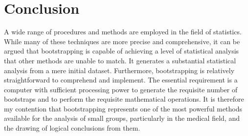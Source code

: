 
\chapter{Conclusion} \label{Conclusion}
A wide range of procedures and methods are employed in the field of statistics. While many of these techniques are more precise and comprehensive, it can be argued that bootstrapping is capable of achieving a level of statistical analysis that other methods are unable to match. It generates a substantial statistical analysis from a mere initial dataset. Furthermore, bootstrapping is relatively straightforward to comprehend and implement. The essential requirement is a computer with sufficient processing power to generate the requisite number of bootstraps and to perform the requisite mathematical operations. It is therefore my contention that bootstrapping represents one of the most powerful methods available for the analysis of small groups, particularly in the medical field, and the drawing of logical conclusions from them.
